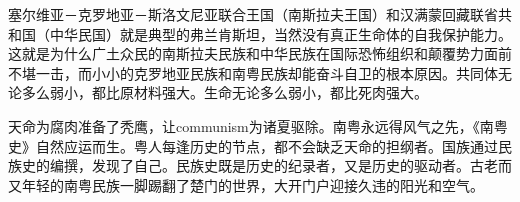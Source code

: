 塞尔维亚－克罗地亚－斯洛文尼亚联合王国（南斯拉夫王国）和汉满蒙回藏联省共和国（中华民国）就是典型的弗兰肯斯坦，当然没有真正生命体的自我保护能力。这就是为什么广土众民的南斯拉夫民族和中华民族在国际恐怖组织和颠覆势力面前不堪一击，而小小的克罗地亚民族和南粤民族却能奋斗自卫的根本原因。共同体无论多么弱小，都比原材料强大。生命无论多么弱小，都比死肉强大。

天命为腐肉准备了秃鹰，让communism为诸夏驱除。南粤永远得风气之先，《南粤史》自然应运而生。粤人每逢历史的节点，都不会缺乏天命的担纲者。国族通过民族史的编撰，发现了自己。民族史既是历史的纪录者，又是历史的驱动者。古老而又年轻的南粤民族一脚踢翻了楚门的世界，大开门户迎接久违的阳光和空气。

